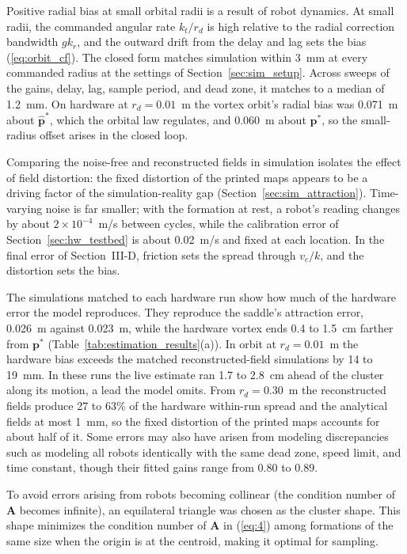 \documentclass[lettersize,journal]{IEEEtran}
\newcommand{\rev}[1]{#1}
\begin{document}
Positive radial bias at small orbital radii is a result of robot dynamics. At small radii, the commanded angular rate $k_t / r_d$ is high relative to the radial correction bandwidth $gk_r$, and the outward drift from the delay and lag sets the bias (\ref{eq:orbit_cf}). The closed form matches simulation within \rev{3}~mm at every commanded radius at the settings of Section~\ref{sec:sim_setup}. Across sweeps of the gains, delay, lag, sample period, and dead zone, it matches to a median of \rev{1.2}~mm. On hardware at $r_d = 0.01$~m the vortex orbit's radial bias was \rev{0.071}~m about $\hat{\mathbf{p}}^*$, which the orbital law regulates, and \rev{0.060}~m about $\mathbf{p}^*$, so the small-radius offset arises in the closed loop.

Comparing the noise-free and reconstructed fields in simulation isolates the effect of field distortion: the fixed distortion of the printed maps appears to be a driving factor of the simulation-reality gap (Section~\ref{sec:sim_attraction}). Time-varying noise is far smaller; with the formation at rest, a robot's reading changes by about \rev{$2\times10^{-4}$}~m/s between cycles, while the calibration error of Section~\ref{sec:hw_testbed} is about 0.02~m/s and fixed at each location. In the final error of Section~III-D, friction sets the spread through $v_c/k$, and the distortion sets the bias.

The simulations matched to each hardware run show how much of the hardware error the model reproduces. They reproduce the saddle's attraction error, \rev{0.026}~m against \rev{0.023}~m, while the hardware vortex ends \rev{0.4} to \rev{1.5}~cm farther from $\mathbf{p}^*$ (Table~\ref{tab:estimation_results}(a)). In orbit at $r_d = 0.01$~m the hardware bias exceeds the matched reconstructed-field simulations by \rev{14} to \rev{19}~mm. In these runs the live estimate ran \rev{1.7} to \rev{2.8}~cm ahead of the cluster along its motion, a lead the model omits. From $r_d = 0.30$~m the reconstructed fields produce \rev{27} to \rev{63}\% of the hardware within-run spread and the analytical fields at most \rev{1}~mm, so the fixed distortion of the printed maps accounts for about half of it. Some errors may also have arisen from modeling discrepancies such as modeling all robots identically with the same dead zone, speed limit, and time constant, though their fitted gains range from \rev{0.80} to \rev{0.89}.

To avoid errors arising from robots becoming collinear (the condition number of $\mathbf{A}$ becomes infinite), an equilateral triangle was chosen as the cluster shape. This shape minimizes the condition number of $\mathbf{A}$ in (\ref{eq:4}) among formations of the same size when the origin is at the centroid, making it optimal for sampling.
\end{document}

